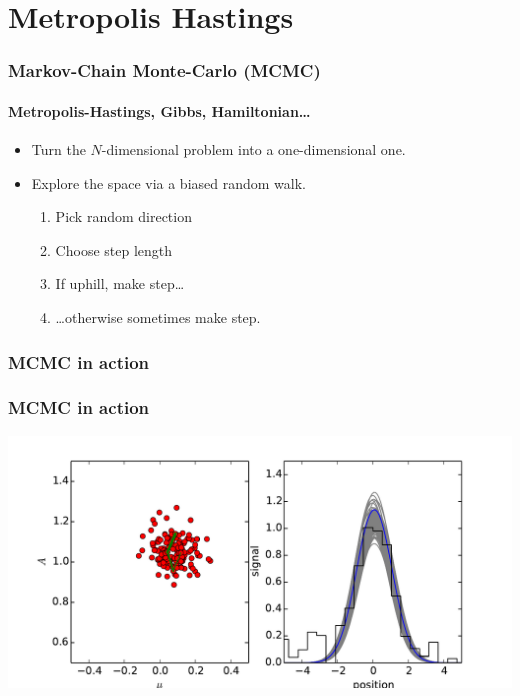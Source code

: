 \documentclass[]{beamer}
\begin{document}
\section{Metropolis Hastings}

\begin{frame}
  \frametitle{Markov-Chain Monte-Carlo (MCMC)} 
  \framesubtitle{Metropolis-Hastings, Gibbs, Hamiltonian\ldots} 
  \begin{itemize}
      \pause
    \item Turn the $N$-dimensional problem into a one-dimensional one.
      \pause
    \item Explore the space via a biased random walk.
      \begin{enumerate}
          \pause
        \item Pick random direction
          \pause
        \item Choose step length
          \pause
        \item If uphill, make step\ldots
          \pause
        \item \ldots otherwise sometimes make step. 
      \end{enumerate}
  \end{itemize}
 
\end{frame}

\begin{frame}
  \frametitle{MCMC in action} 
\end{frame}
\begin{frame}
  \frametitle{MCMC in action} 
  \includegraphics[width=\textwidth]{movies/MCMC_1.pdf}
\end{frame}
\end{document}
